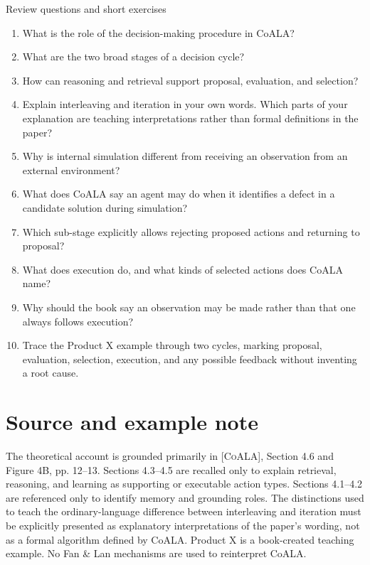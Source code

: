 \begin{reviewquestions}{Review questions and short exercises}
\begin{enumerate}
  \item What is the role of the decision-making procedure in CoALA?
  \item What are the two broad stages of a decision cycle?
  \item How can reasoning and retrieval support proposal, evaluation, and selection?
  \item Explain interleaving and iteration in your own words. Which parts of your explanation are teaching interpretations rather than formal definitions in the paper?
  \item Why is internal simulation different from receiving an observation from an external environment?
  \item What does CoALA say an agent may do when it identifies a defect in a candidate solution during simulation?
  \item Which sub-stage explicitly allows rejecting proposed actions and returning to proposal?
  \item What does execution do, and what kinds of selected actions does CoALA name?
  \item Why should the book say an observation may be made rather than that one always follows execution?
  \item Trace the Product X example through two cycles, marking proposal, evaluation, selection, execution, and any possible feedback without inventing a root cause.
\end{enumerate}
\end{reviewquestions}

\section*{Source and example note}
The theoretical account is grounded primarily in \textsc{[CoALA]}, Section 4.6 and Figure 4B, pp. 12--13. Sections 4.3--4.5 are recalled only to explain retrieval, reasoning, and learning as supporting or executable action types. Sections 4.1--4.2 are referenced only to identify memory and grounding roles. The distinctions used to teach the ordinary-language difference between interleaving and iteration must be explicitly presented as explanatory interpretations of the paper's wording, not as a formal algorithm defined by CoALA. Product X is a book-created teaching example. No Fan \& Lan mechanisms are used to reinterpret CoALA.


